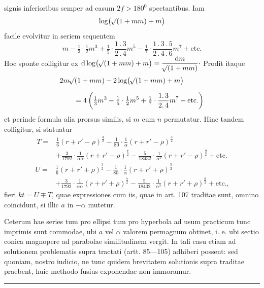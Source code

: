 \noindent signis inferioribus semper ad casum $2f>180^0$ spectantibus. Iam
\[
\log\bigl(\mathord{{}^{}\!\surd}(1+mm)+m\bigr)
\]
\noindent facile evolvitur in seriem sequentem
\[
m-\tfrac13\cdot\tfrac12m^3+\tfrac15\cdot\frac{1\mathpunct{.}3}{2\mathpunct{.}4}m^5-\tfrac17\cdot\frac{1\mathpunct{.}3\mathpunct{.}5}{2\mathpunct{.}4\mathpunct{.}6}m^7+\text{etc.}
\]
\noindent Hoc sponte colligitur ex $\mathrm d\log\bigl(\mathord{{}^{}\!\surd}(1+mm)+m\bigr)=\dfrac{\mathrm dm}{\mathord{{}^{}\!\surd}(1+mm)}\mathpunct{\cdot}$ Prodit itaque
\[
\begin{aligned}
&2m\mathord{{}^{}\!\surd}(1+mm)-2\log\bigl(\mathord{{}^{}\!\surd}(1+mm)+m\bigr)\\[.6em]
&\qquad=4\left(\tfrac13m^3-\tfrac15\cdot\tfrac12m^5+\tfrac17\cdot\frac{1\mathpunct{.}3}{2\mathpunct{.}4}m^7-\text{etc.}\right)
\end{aligned}
\]
\noindent{}et perinde formula alia prorsus similis, si $m$ cum $n$ permutatur. Hinc tandem colligitur, si statuatur
\[
\begin{aligned}
T={}&\tfrac16(r+r'-\rho)^{\frac32}-\tfrac1{80}\cdot\frac1\alpha(r+r'-\rho)^{\frac52}\\[.6em]
&+\tfrac3{1792}\cdot\frac1{\alpha\alpha}(r+r'-\rho)^{\frac72}-\tfrac5{18432}\cdot\frac1{\alpha^3}(r+r'-\rho)^{\frac92}+\text{etc.}
\end{aligned}
\]
\[
\begin{aligned}
U={}&\tfrac16(r+r'+\rho)^{\frac32}-\tfrac1{80}\cdot\frac1\alpha(r+r'+\rho)^{\frac52}\\[.6em]
&+\tfrac3{1792}\cdot\frac1{\alpha\alpha}(r+r'+\rho)^{\frac72}-\tfrac5{18432}\cdot\frac1{\alpha^3}(r+r'+\rho)^{\frac92}+\text{etc.,}
\end{aligned}
\]
\noindent fieri $kt=U\mp T$, quae expressiones cum iis, quae in art. 107 traditae sunt, omnino coincidunt, si illic $a$ in $-\alpha$ mutetur.
\par
Ceterum hae series tum pro ellipsi tum pro hyperbola ad usum practicum tunc imprimis sunt commodae, ubi $a$ vel $\alpha$ valorem permagnum obtinet, i. e. ubi sectio conica magnopere ad parabolae similitudinem vergit. In tali casu etiam ad solutionem problematis supra tractati (artt. 85---105) adhiberi possent: sed quoniam, nostro iudicio, ne tunc quidem brevitatem solutionis supra traditae praebent, huic methodo fusius exponendae non immoramur.
\par\bigskip\begin{center}\rule{.23\linewidth}{.35pt}\end{center}
